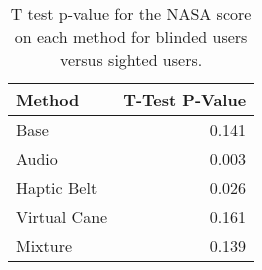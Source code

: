 
\begin{table}[!htb]
\centering
\caption{T test p-value for the NASA score on each method for blinded users versus sighted users.}
\label{tab:ttest_nasa_score}
\begin{tabular}{lr}
\toprule
      Method &  T-Test P-Value \\
\midrule
        Base &           0.141 \\
       Audio &           0.003 \\
 Haptic Belt &           0.026 \\
Virtual Cane &           0.161 \\
     Mixture &           0.139 \\
\bottomrule
\end{tabular}
\end{table}

